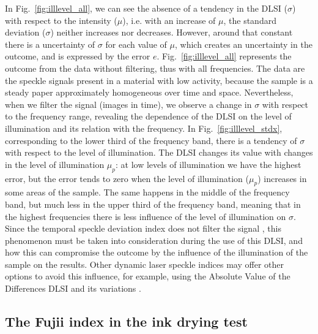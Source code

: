 \documentclass[review]{elsarticle}
\begin{document}
In Fig.~\ref{fig:illlevel_all}, we can see the absence of a tendency in the DLSI ($\sigma$) 
with respect to the intensity ($\mu$), 
i.e. with an increase of $\mu$, the standard deviation ($\sigma$) neither increases nor decreases.
However, around that constant there is a uncertainty of $\sigma$ for each value of $\mu$, which creates an uncertainty in the outcome, 
and is expressed by the error $e$.
Fig.~\ref{fig:illlevel_all} represents the outcome from the data without filtering, thus with all frequencies.
The data are the speckle signals present in a material with low activity, 
because the sample is a steady paper approximately homogeneous over time and space.
Nevertheless, when we filter the signal (images in time), 
we observe a change in $\sigma$ with respect to the frequency range, 
revealing the dependence of the DLSI on the level of illumination and its relation with the frequency.
In Fig.~\ref{fig:illlevel_stdx}, corresponding to the lower third of the frequency band, 
there is a tendency of $\sigma$ with respect to the level of illumination.
The DLSI changes its value with  changes in the level of illumination $\mu_p$:
at low levels of illumination we have the highest error, 
but the error tends to zero when the level of illumination ($\mu_p$) increases in some areas of the sample.
The same happens in the middle of the frequency band, 
but much less in the upper third of the frequency band, 
meaning that in the highest frequencies there is less influence of the level of illumination on $\sigma$.
Since the 
temporal speckle deviation index
does not filter the signal \cite{RIVERA2017144}, 
this phenomenon must be taken into consideration during the use of this DLSI, 
and how this can compromise the outcome by the influence of the illumination of the sample on the results.
Other dynamic laser speckle indices may offer other options to avoid this influence,
for example, using the Absolute Value of the Differences DLSI and its variations \cite{BSLTLBOOK}.

\subsection{The Fujii index in the ink drying test} 
\label{subsec:vsfujii}
\end{document}
